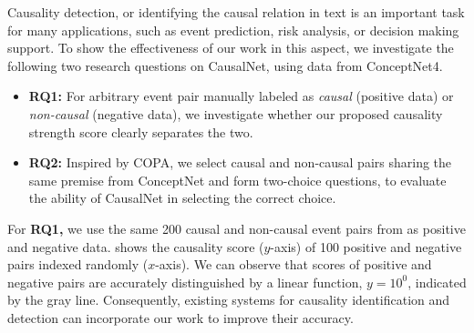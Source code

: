 Causality detection, or identifying the causal relation in text is 
an important task for many applications, such as event prediction, 
risk analysis, or decision making support\cite{mirza2014extracting}. 
To show the effectiveness of our work in this aspect, 
we investigate the following two research questions on 
CausalNet, using data from ConceptNet4.
\begin{itemize}
\item {\bf RQ1:}
For arbitrary event pair manually labeled as \emph{causal} (positive data)
or \emph{non-causal} (negative data), we investigate whether our
proposed causality strength score clearly separates the two.
\item {\bf RQ2:} Inspired by COPA, we select causal and non-causal pairs
sharing the same premise from ConceptNet and form two-choice
questions, to evaluate the ability of CausalNet in selecting the
correct choice.
\end{itemize}




For {\bf RQ1,}
we use the same 200 causal and non-causal event pairs from
 as positive and negative data.
 shows the causality score ($y$-axis) of 100 positive
and negative pairs indexed randomly ($x$-axis). We can observe that scores
of positive and negative pairs are accurately distinguished by a
linear function, $y=10^{0}$, indicated by the gray line.
Consequently, existing systems for causality identification and detection 
can incorporate our work to improve their accuracy.

